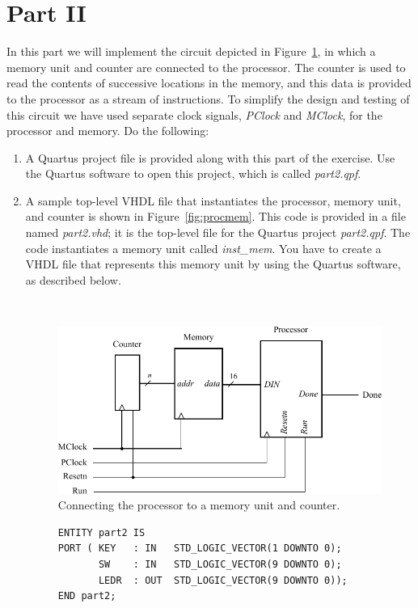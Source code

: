\documentclass[epsfig,10pt,fullpage]{article}
\begin{document}
\section*{Part II}
In this part we will implement the circuit depicted in Figure~\ref{fig:fig4}, in which a 
memory unit and counter are connected to the processor. The
counter is used to read the contents of successive locations in the memory, and
this data is provided to the processor as a stream of instructions. To simplify the
design and testing of this circuit we have used separate clock signals, {\it PClock} 
and {\it MClock}, for the processor and memory. Do the following:

\begin{enumerate}
\item A Quartus project file is provided along with this part of the exercise.  Use the 
Quartus software to open this project, which is called {\it part2.qpf}.
\item A sample top-level VHDL file that instantiates the processor, memory unit, and
counter is shown in Figure~\ref{fig:procmem}. This code is provided in a file named
{\it part2.vhd}; it is the top-level file for the Quartus project {\it part2.qpf}. The 
code instantiates a memory unit called {\it inst\_mem}. You have to create a VHDL file
that represents this memory unit by using the Quartus software, as described below.

~\\
\begin{figure}[H]
	\begin{center}
		\includegraphics[]{figures/figure4.pdf}
	\end{center}
	\caption{Connecting the processor to a memory unit and counter.}
	\label{fig:fig4}
\end{figure}
\newpage
\lstset{language=VHDL,numbers=none,escapechar=|}
\begin{figure}[h]
\begin{center}
\begin{minipage}[t]{15 cm}
\begin{lstlisting}[name=proc]
ENTITY part2 IS 
PORT ( KEY   : IN   STD_LOGIC_VECTOR(1 DOWNTO 0);
       SW    : IN   STD_LOGIC_VECTOR(9 DOWNTO 0);
       LEDR  : OUT  STD_LOGIC_VECTOR(9 DOWNTO 0));
END part2;


\end{lstlisting}
\end{minipage}
\end{center}
\end{figure}
\end{enumerate}
\end{document}
